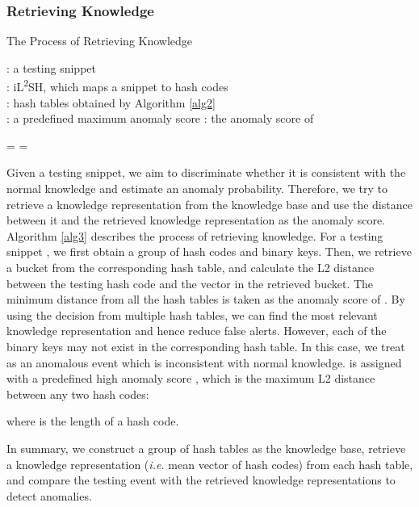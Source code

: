 \documentclass[lettersize,journal]{IEEEtran}
\begin{document}
\subsubsection{Retrieving Knowledge}
\begin{algorithm}[!t]
	\caption{The Process of Retrieving Knowledge}
	\begin{algorithmic}
		\Require : a testing snippet \\
		\quad : iL\textsuperscript{2}SH, which maps a snippet to  hash codes \\
		\quad :  hash tables obtained by Algorithm \ref{alg2} \\
		\quad : a predefined maximum anomaly score
		\Ensure : the anomaly score of 

		\State    \State  = 
		\For{each }
			\State   {} 
\State  = 
				\If {}
					\State 
				\EndIf
			\EndIf
		\EndFor

		
	\end{algorithmic} 
	\label{alg3} 
\end{algorithm}

Given a testing snippet, we aim to discriminate whether it is consistent with the normal knowledge and estimate an anomaly probability.
Therefore, we try to retrieve a knowledge representation from the knowledge base and use the distance between it and the retrieved knowledge representation as the anomaly score.
Algorithm \ref{alg3} describes the process of retrieving knowledge.
For a testing snippet , we first obtain a group of hash codes and binary keys.
Then, we retrieve a bucket from the corresponding hash table, and calculate the L2 distance between the testing hash code and the vector in the retrieved bucket.
The minimum distance from all the hash tables is taken as the anomaly score of .
By using the decision from multiple hash tables, we can find the most relevant knowledge representation and hence reduce false alerts.
However, each of the binary keys may not exist in the corresponding hash table.
In this case, we treat  as an anomalous event which is inconsistent with normal knowledge.
 is assigned with a predefined high anomaly score , which is the maximum L2 distance between any two hash codes:

where  is the length of a hash code.

In summary, we construct a group of hash tables as the knowledge base, retrieve a knowledge representation (\textit{i.e.} mean vector of hash codes) from each hash table, and compare the testing event with the retrieved knowledge representations to detect anomalies.
\end{document}
